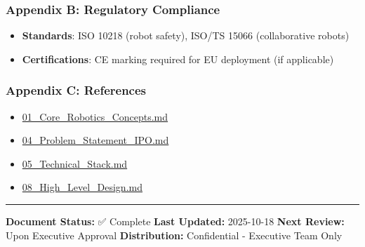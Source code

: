 \documentclass[
]{article}
\providecommand{\tightlist}{%
  \setlength{\itemsep}{0pt}\setlength{\parskip}{0pt}}
\begin{document}
\hypertarget{appendix-b-regulatory-compliance}{%
\subsubsection{Appendix B: Regulatory
Compliance}\label{appendix-b-regulatory-compliance}}

\begin{itemize}
\tightlist
\item
  \textbf{Standards}: ISO 10218 (robot safety), ISO/TS 15066
  (collaborative robots)
\item
  \textbf{Certifications}: CE marking required for EU deployment (if
  applicable)
\end{itemize}

\hypertarget{appendix-c-references}{%
\subsubsection{Appendix C: References}\label{appendix-c-references}}

\begin{itemize}
\tightlist
\item
  \href{./01_Core_Robotics_Concepts.md}{01\_Core\_Robotics\_Concepts.md}
\item
  \href{./04_Problem_Statement_IPO.md}{04\_Problem\_Statement\_IPO.md}
\item
  \href{./05_Technical_Stack.md}{05\_Technical\_Stack.md}
\item
  \href{./08_High_Level_Design.md}{08\_High\_Level\_Design.md}
\end{itemize}

\begin{center}\rule{0.5\linewidth}{0.5pt}\end{center}

\textbf{Document Status:} ✅ Complete \textbf{Last Updated:} 2025-10-18
\textbf{Next Review:} Upon Executive Approval \textbf{Distribution:}
Confidential - Executive Team Only
\end{document}
